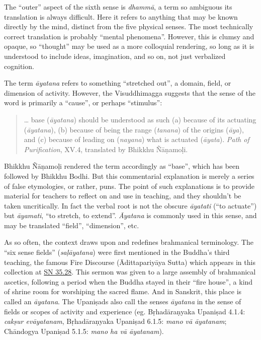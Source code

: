 \documentclass[12pt,openany]{book}%
\begin{document}
The “outer” aspect of the sixth sense is \textit{\textsanskrit{dhammā}}, a term so ambiguous its translation is always difficult. Here it refers to anything that may be known directly by the mind, distinct from the five physical senses. The most technically correct translation is probably “mental phenomena”. However, this is clumsy and opaque, so “thought” may be used as a more colloquial rendering, so long as it is understood to include ideas, imagination, and so on, not just verbalized cognition.

The term \textit{\textsanskrit{āyatana}} refers to something “stretched out”, a domain, field, or dimension of activity. However, the Visuddhimagga suggests that the sense of the word is primarily a “cause”, or perhaps “stimulus”:

\begin{quotation}%
… base (\textit{\textsanskrit{āyatana}}) should be understood as such (a) because of its actuating (\textit{\textsanskrit{āyatana}}), (b) because of being the range (\textit{tanana}) of the origins (\textit{\textsanskrit{āya}}), and (c) because of leading on (\textit{nayana}) what is actuated (\textit{\textsanskrit{āyata}}). \textit{Path of Purification}, XV.4, translated by Bhikkhu \textsanskrit{Ñāṇamoḷi}.

%
\end{quotation}

Bhikkhu \textsanskrit{Ñāṇamoḷi} rendered the term accordingly as “base”, which has been followed by Bhikkhu Bodhi. But this commentarial explanation is merely a series of false etymologies, or rather, puns. The point of such explanations is to provide material for teachers to reflect on and use in teaching, and they shouldn’t be taken uncritically. In fact the verbal root is not the obscure \textit{\textsanskrit{āyatati}} (“to actuate”) but \textit{\textsanskrit{āyamati}}, “to stretch, to extend”. \textit{Āyatana} is commonly used in this sense, and may be translated “field”, “dimension”, etc.

As so often, the context draws upon and redefines brahmanical terminology. The “six sense fields” (\textit{\textsanskrit{saḷāyatana}}) were first mentioned in the Buddha’s third teaching, the famous Fire Discourse (\textsanskrit{Ādittapariyāya} Sutta) which appears in this collection at \href{https://suttacentral.net/sn35.28}{SN 35.28}. This sermon was given to a large assembly of brahmanical ascetics, following a period when the Buddha stayed in their “fire house”, a kind of shrine room for worshiping the sacred flame. And in Sanskrit, this place is called an \textit{\textsanskrit{āyatana}}. The \textsanskrit{Upaniṣads} also call the senses \textit{\textsanskrit{āyatana}} in the sense of fields or scopes of activity and experience (eg. \textsanskrit{Bṛhadāraṇyaka} \textsanskrit{Upaniṣad} 4.1.4: \textit{\textsanskrit{cakṣur} \textsanskrit{evāyatanam}}, \textsanskrit{Bṛhadāraṇyaka} \textsanskrit{Upaniṣad} 6.1.5: \textit{mano \textsanskrit{vā} \textsanskrit{āyatanam}}; \textsanskrit{Chāndogya} \textsanskrit{Upaniṣad} 5.1.5: \textit{mano ha \textsanskrit{vā} \textsanskrit{āyatanam}}).
\end{document}
